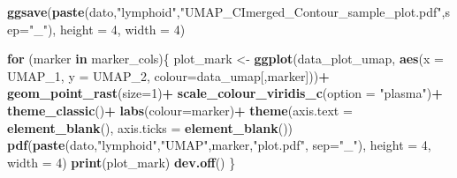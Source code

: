 \documentclass[
]{article}
\newenvironment{Shaded}{\begin{snugshade}}{\end{snugshade}}
\newcommand{\AttributeTok}[1]{\textcolor[rgb]{0.13,0.29,0.53}{#1}}
\newcommand{\ControlFlowTok}[1]{\textcolor[rgb]{0.13,0.29,0.53}{\textbf{#1}}}
\newcommand{\DecValTok}[1]{\textcolor[rgb]{0.00,0.00,0.81}{#1}}
\newcommand{\FunctionTok}[1]{\textcolor[rgb]{0.13,0.29,0.53}{\textbf{#1}}}
\newcommand{\NormalTok}[1]{#1}
\newcommand{\OtherTok}[1]{\textcolor[rgb]{0.56,0.35,0.01}{#1}}
\newcommand{\SpecialCharTok}[1]{\textcolor[rgb]{0.81,0.36,0.00}{\textbf{#1}}}
\newcommand{\StringTok}[1]{\textcolor[rgb]{0.31,0.60,0.02}{#1}}
\begin{document}
\begin{Shaded}
\begin{Highlighting}[]
\FunctionTok{ggsave}\NormalTok{(}\FunctionTok{paste}\NormalTok{(dato,}\StringTok{"lymphoid"}\NormalTok{,}\StringTok{"UMAP\_CImerged\_Contour\_sample\_plot.pdf"}\NormalTok{,}\AttributeTok{sep=}\StringTok{"\_"}\NormalTok{), }\AttributeTok{height =} \DecValTok{4}\NormalTok{, }\AttributeTok{width =} \DecValTok{4}\NormalTok{)}

\ControlFlowTok{for}\NormalTok{ (marker }\ControlFlowTok{in}\NormalTok{ marker\_cols)\{}
\NormalTok{  plot\_mark }\OtherTok{\textless{}{-}} \FunctionTok{ggplot}\NormalTok{(data\_plot\_umap, }\FunctionTok{aes}\NormalTok{(}\AttributeTok{x =}\NormalTok{ UMAP\_1, }\AttributeTok{y =}\NormalTok{ UMAP\_2, }\AttributeTok{colour=}\NormalTok{data\_umap[,marker]))}\SpecialCharTok{+} 
    \FunctionTok{geom\_point\_rast}\NormalTok{(}\AttributeTok{size=}\DecValTok{1}\NormalTok{)}\SpecialCharTok{+}
    \FunctionTok{scale\_colour\_viridis\_c}\NormalTok{(}\AttributeTok{option =} \StringTok{"plasma"}\NormalTok{)}\SpecialCharTok{+}
    \FunctionTok{theme\_classic}\NormalTok{()}\SpecialCharTok{+}
    \FunctionTok{labs}\NormalTok{(}\AttributeTok{colour=}\NormalTok{marker)}\SpecialCharTok{+}
    \FunctionTok{theme}\NormalTok{(}\AttributeTok{axis.text =} \FunctionTok{element\_blank}\NormalTok{(), }\AttributeTok{axis.ticks =} \FunctionTok{element\_blank}\NormalTok{())}
  \FunctionTok{pdf}\NormalTok{(}\FunctionTok{paste}\NormalTok{(dato,}\StringTok{"lymphoid"}\NormalTok{,}\StringTok{"UMAP"}\NormalTok{,marker,}\StringTok{"plot.pdf"}\NormalTok{, }\AttributeTok{sep=}\StringTok{"\_"}\NormalTok{), }\AttributeTok{height =} \DecValTok{4}\NormalTok{, }\AttributeTok{width =} \DecValTok{4}\NormalTok{)}
  \FunctionTok{print}\NormalTok{(plot\_mark)}
  \FunctionTok{dev.off}\NormalTok{()}
\NormalTok{\}}
\end{Highlighting}
\end{Shaded}
\end{document}
